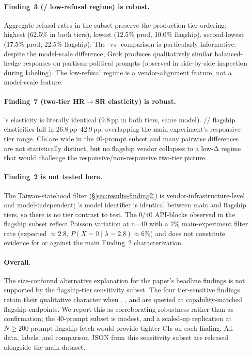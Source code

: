 \paragraph{Finding~3 (/ low-refusal regime)
is robust.}
Aggregate refusal rates in the subset preserve the production-tier
ordering:  highest (62.5\% in both tiers),
 lowest (12.5\% prod, 10.0\% flagship), 
second-lowest (17.5\% prod, 22.5\% flagship). The
-vs- comparison is
particularly informative: despite the model-scale difference, Grok
produces qualitatively similar balanced-hedge responses on
partisan-political prompts (observed in side-by-side inspection during
labeling). The low-refusal regime is a vendor-alignment feature,
not a model-scale feature.

\paragraph{Finding~7 (two-tier HR$\to$SR elasticity) is robust.}
's elasticity is literally identical (9.8\,pp in both
tiers, same model). //
flagship elasticities fall in 26.8\,pp--42.9\,pp, overlapping the main
experiment's responsive-tier range. CIs are wide in the 40-prompt
subset and many pairwise differences are not statistically distinct,
but no flagship vendor collapses to a low-Δ regime that would
challenge the responsive/non-responsive two-tier picture.

\paragraph{Finding~2 is not tested here.}
The  Taiwan-statehood filter (§\ref{sec:results-finding2})
is vendor-infrastructure-level and model-independent;
's model identifier is identical between main and
flagship tiers, so there is no tier contrast to test. The 0/40
API-blocks observed in the flagship subset reflect Poisson variation
at n=40 with a 7\% main-experiment filter rate (expected
$\approx 2.8$, $P(X=0 \mid \lambda=2.8) \approx 6\%$) and does not
constitute evidence for or against the main Finding~2 characterization.

\paragraph{Overall.}
The size-confound alternative explanation for the paper's headline
findings is not supported by the flagship-tier sensitivity subset.
The four tier-sensitive findings retain their qualitative character
when , , and  are queried
at capability-matched flagship endpoints. We report this as
corroborating robustness rather than as confirmation; the 40-prompt
subset is modest, and a scaled-up replication at
$N \geq 200$-prompt flagship fetch would provide tighter CIs on each
finding. All data, labels, and comparison JSON from this sensitivity
subset are released alongside the main dataset.

